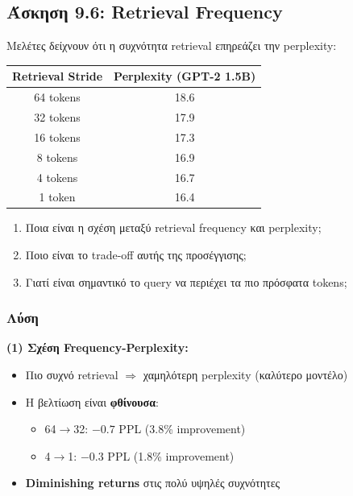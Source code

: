 \subsection{Άσκηση 9.6: Retrieval Frequency}

\begin{formulabox}[Εκφώνηση]
Μελέτες δείχνουν ότι η συχνότητα retrieval επηρεάζει την perplexity:

\begin{center}
\begin{tabular}{cc}
\toprule
\textbf{Retrieval Stride} & \textbf{Perplexity (GPT-2 1.5B)} \\
\midrule
64 tokens & 18.6 \\
32 tokens & 17.9 \\
16 tokens & 17.3 \\
8 tokens & 16.9 \\
4 tokens & 16.7 \\
1 token & 16.4 \\
\bottomrule
\end{tabular}
\end{center}

\begin{enumerate}
    \item Ποια είναι η σχέση μεταξύ retrieval frequency και perplexity;
    \item Ποιο είναι το trade-off αυτής της προσέγγισης;
    \item Γιατί είναι σημαντικό το query να περιέχει τα πιο πρόσφατα tokens;
\end{enumerate}
\end{formulabox}

\subsubsection*{Λύση}

\textbf{(1) Σχέση Frequency-Perplexity:}

\begin{itemize}
    \item Πιο συχνό retrieval $\Rightarrow$ χαμηλότερη perplexity (καλύτερο μοντέλο)
    \item Η βελτίωση είναι \textbf{φθίνουσα}:
    \begin{itemize}
        \item 64$\to$32: $-0.7$ PPL (3.8\% improvement)
        \item 4$\to$1: $-0.3$ PPL (1.8\% improvement)
    \end{itemize}
    \item \textbf{Diminishing returns} στις πολύ υψηλές συχνότητες
\end{itemize}

